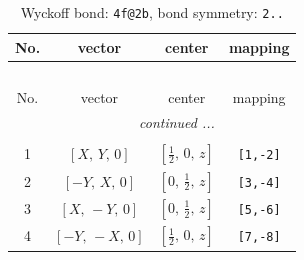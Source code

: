 \documentclass[fleqn,8pt]{jsarticle}
\begin{document}
\renewcommand{\arraystretch}{1.2}
\begin{longtable}{cccc}
\caption{Wyckoff bond: {\tt 4f@2b}, bond symmetry: {\tt 2..}}
 \\
 \hline \hline
No. & vector & center & mapping \\ \hline \endfirsthead

\multicolumn{3}{l}{\tablename\ \thetable{}} \\
 \hline \hline
No. & vector & center & mapping \\ \hline \endhead

 \hline \hline
\multicolumn{3}{r}{\footnotesize\it continued ...} \\ \endfoot

 \hline \hline
\multicolumn{3}{r}{} \\ \endlastfoot

1 & $\left[ X,\, Y,\, 0 \right]$ & $\left[ \frac{1}{2},\, 0,\, z \right]$ & {\tt [1,-2]} \\ \hline
2 & $\left[ - Y,\, X,\, 0 \right]$ & $\left[ 0,\, \frac{1}{2},\, z \right]$ & {\tt [3,-4]} \\ \hline
3 & $\left[ X,\, - Y,\, 0 \right]$ & $\left[ 0,\, \frac{1}{2},\, z \right]$ & {\tt [5,-6]} \\ \hline
4 & $\left[ - Y,\, - X,\, 0 \right]$ & $\left[ \frac{1}{2},\, 0,\, z \right]$ & {\tt [7,-8]} \\
\end{longtable}
\renewcommand{\arraystretch}{1.2}
\end{document}
